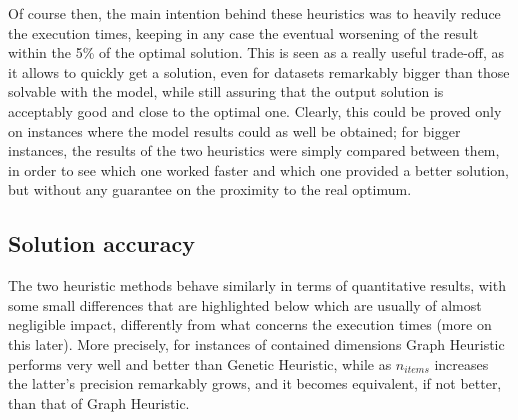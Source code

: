\documentclass{article}
\begin{document}
Of course then, the main intention behind these heuristics was to heavily reduce the execution times, keeping in any case the eventual worsening of the result within the 5\% of the optimal solution. This is seen as a really useful trade-off, as it allows to quickly get a solution, even for datasets remarkably bigger than those solvable with the model, while still assuring that the output solution is acceptably good and close to the optimal one. Clearly, this could be proved only on instances where the model results could as well be obtained; for bigger instances, the results of the two heuristics were simply compared between them, in order to see which one worked faster and which one provided a better solution, but without any guarantee on the proximity to the real optimum.
 
\subsection{Solution accuracy}

The two heuristic methods behave similarly in terms of quantitative results, with some small differences that are highlighted below which are usually of almost negligible impact, differently from what concerns the execution times (more on this later). More precisely, for instances of contained dimensions Graph Heuristic performs very well and better than Genetic Heuristic, while as $n_{items}$ increases the latter's precision remarkably grows, and it becomes equivalent, if not better, than that of Graph Heuristic. \\
\end{document}
